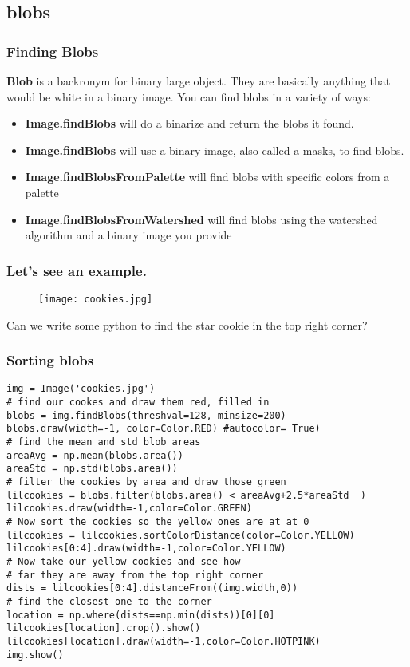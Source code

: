 \documentclass[compress]{beamer}
\begin{document}
\subsection{blobs}
\begin{frame}
  \frametitle{Finding Blobs}

\textbf{Blob} is a backronym for binary large object. They are
basically anything that would be white in a binary image. You can find
blobs in a variety of ways:
\begin{itemize}
\item \textbf{Image.findBlobs} will do a binarize and return the blobs
  it found.
\item \textbf{Image.findBlobs} will use a binary image, also called a
  masks, to find blobs.
\item \textbf{Image.findBlobsFromPalette} will find blobs with
  specific colors from a palette
\item \textbf{Image.findBlobsFromWatershed} will find blobs using the
  watershed algorithm and a binary image you provide
\end{itemize}
\end{frame}
\begin{frame}
  \frametitle{Let's see an example.}
 \begin{figure}
     \texttt{[image: cookies.jpg]}
 \end{figure}
Can we write some python to find the star cookie in the top right corner?
\end{frame}
\begin{frame}[fragile] 
\frametitle{Sorting blobs}
\begin{example}
\begin{verbatim}
img = Image('cookies.jpg')
# find our cookes and draw them red, filled in
blobs = img.findBlobs(threshval=128, minsize=200)
blobs.draw(width=-1, color=Color.RED) #autocolor= True)
# find the mean and std blob areas
areaAvg = np.mean(blobs.area())
areaStd = np.std(blobs.area())
# filter the cookies by area and draw those green
lilcookies = blobs.filter(blobs.area() < areaAvg+2.5*areaStd  )
lilcookies.draw(width=-1,color=Color.GREEN)
# Now sort the cookies so the yellow ones are at at 0
lilcookies = lilcookies.sortColorDistance(color=Color.YELLOW)
lilcookies[0:4].draw(width=-1,color=Color.YELLOW)
# Now take our yellow cookies and see how
# far they are away from the top right corner
dists = lilcookies[0:4].distanceFrom((img.width,0))
# find the closest one to the corner
location = np.where(dists==np.min(dists))[0][0]
lilcookies[location].crop().show()
lilcookies[location].draw(width=-1,color=Color.HOTPINK)
img.show()
\end{verbatim}
\end{example}
\end{frame} 
\end{document}

